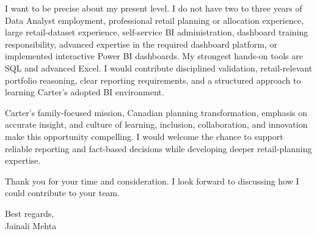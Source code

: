 \documentclass[letterpaper,10pt]{article}
\begin{document}
I want to be precise about my present level. I do not have two to three years of Data Analyst employment, professional retail planning or allocation experience, large retail-dataset experience, self-service BI administration, dashboard training responsibility, advanced expertise in the required dashboard platform, or implemented interactive Power BI dashboards. My strongest hands-on tools are SQL and advanced Excel. I would contribute disciplined validation, retail-relevant portfolio reasoning, clear reporting requirements, and a structured approach to learning Carter's adopted BI environment.

Carter's family-focused mission, Canadian planning transformation, emphasis on accurate insight, and culture of learning, inclusion, collaboration, and innovation make this opportunity compelling. I would welcome the chance to support reliable reporting and fact-based decisions while developing deeper retail-planning expertise.

Thank you for your time and consideration. I look forward to discussing how I could contribute to your team.

Best regards,\\[8pt]
Jainali Mehta
\end{document}
